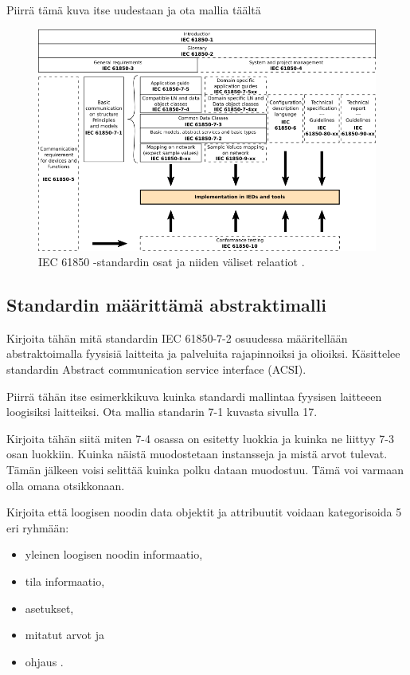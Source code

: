 \begin{it}
	Piirrä tämä kuva itse uudestaan ja ota mallia täältä 
\end{it}

\begin{figure}
	\includegraphics[width=1\textwidth]{pictures/iec61850-series-parts-and-relations.png}
	\caption{IEC 61850 -standardin osat ja niiden väliset relaatiot \cite[s.~14]{IEC61850-7-1} \cite[s.~22]{IEC61850-1}.}
	\label{fig:iec61850-osat-ja-relaatiot}
\end{figure}

\subsection{Standardin määrittämä abstraktimalli}
\begin{it}
	Kirjoita tähän mitä standardin IEC 61850-7-2 osuudessa määritellään abstraktoimalla fyysisiä laitteita ja palveluita rajapinnoiksi ja olioiksi. Käsittelee standardin Abstract communication service interface (ACSI).

	Piirrä tähän itse esimerkkikuva kuinka standardi mallintaa fyysisen laitteeen loogisiksi laitteiksi. Ota mallia standarin 7-1 kuvasta sivulla 17.

	Kirjoita tähän siitä miten 7-4 osassa on esitetty luokkia ja kuinka ne liittyy 7-3 osan luokkiin. Kuinka näistä muodostetaan instansseja ja mistä arvot tulevat. Tämän jälkeen voisi selittää kuinka polku dataan muodostuu. Tämä voi varmaan olla omana otsikkonaan.
	
	Kirjoita että loogisen noodin data objektit ja attribuutit voidaan kategorisoida 5 eri ryhmään:
	\begin{itemize}
		\item yleinen loogisen noodin informaatio,
		\item tila informaatio,
		\item asetukset, 
		\item mitatut arvot ja
		\item ohjaus \cite[s.~25]{IEC61850-1}.
	\end{itemize}
\end{it}

